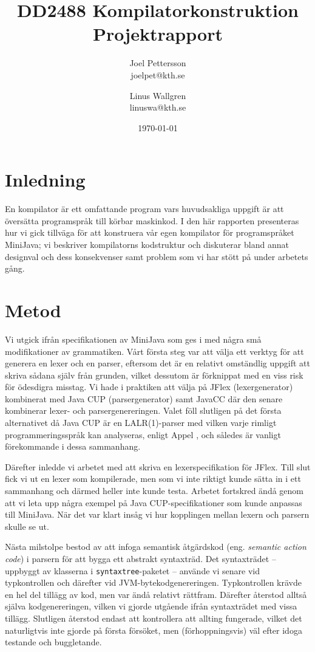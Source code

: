 \documentclass[a4paper,11pt]{article}
\title{
    {\sc DD2488 Kompilatorkonstruktion} \\ 
    Projektrapport
}
\author{
Joel Pettersson \\
joelpet@kth.se \\
\and
Linus Wallgren \\
linuswa@kth.se \\
}
\date{\today}
\newcommand{\trans}[2][eng.]{(#1 \emph{#2})}
\renewcommand{\*}[0]{\cdot}
\begin{document}
\maketitle
\newpage

\section*{Inledning}

En kompilator är ett omfattande program vars huvudsakliga uppgift är att
översätta programspråk till körbar maskinkod. I den här rapporten presenteras
hur vi gick tillväga för att konstruera vår egen kompilator för programspråket
MiniJava; vi beskriver kompilatorns kodstruktur och diskuterar bland annat
designval och dess konsekvenser samt problem som vi har stött på under arbetets
gång.

\section*{Metod}

Vi utgick ifrån specifikationen av MiniJava som ges i \cite{appel2002} med
några små modifikationer av grammatiken. Vårt första steg var att välja ett
verktyg för att generera en lexer och en parser, eftersom det är en relativt
omständlig uppgift att skriva sådana själv från grunden, vilket dessutom är
förknippat med en viss risk för ödesdigra misstag. Vi hade i praktiken att
välja på JFlex (lexergenerator) kombinerat med Java CUP (parsergenerator) samt
JavaCC där den senare kombinerar lexer- och parsergenereringen. Valet föll
slutligen på det första alternativet då Java CUP är en LALR(1)-parser med
vilken varje rimligt programmeringsspråk kan analyseras, enligt Appel
\cite{appel2002}, och således är vanligt förekommande i dessa sammanhang.

Därefter inledde vi arbetet med att skriva en lexerspecifikation för JFlex.
Till slut fick vi ut en lexer som kompilerade, men som vi inte riktigt kunde
sätta in i ett sammanhang och därmed heller inte kunde testa.  Arbetet
fortskred ändå genom att vi leta upp några exempel på Java CUP-specifikationer
som kunde anpassas till MiniJava. När det var klart insåg vi hur kopplingen
mellan lexern och parsern skulle se ut.

Nästa milstolpe bestod av att infoga semantisk åtgärdskod \trans{semantic
action code} i parsern för att bygga ett abstrakt syntaxträd. Det syntaxträdet
-- uppbyggt av klasserna i \texttt{syntaxtree}-paketet -- använde vi senare vid
typkontrollen och därefter vid JVM-bytekodgenereringen. Typkontrollen krävde en
hel del tillägg av kod, men var ändå relativt rättfram. Därefter återstod
alltså själva kodgenereringen, vilken vi gjorde utgående ifrån syntaxträdet med
vissa tillägg. Slutligen återstod endast att kontrollera att allting fungerade,
vilket det naturligtvis inte gjorde på första försöket, men (förhoppningsvis)
väl efter idoga testande och buggletande.
\end{document}
